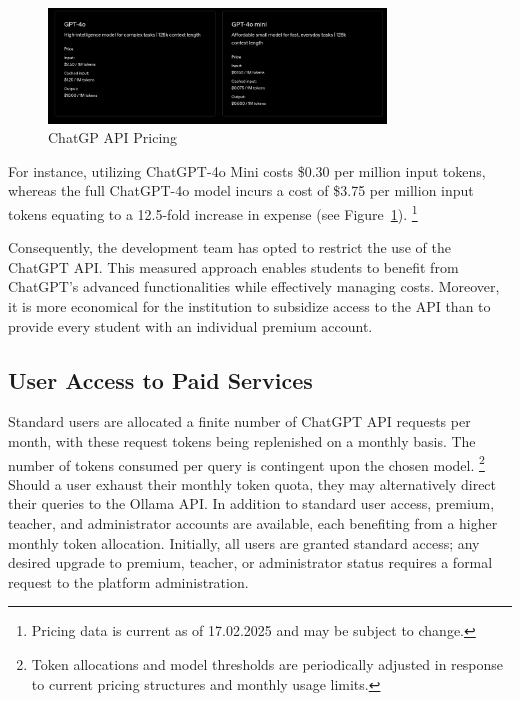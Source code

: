 \begin{figure}[H]
    \centering
    \includegraphics[width=0.8\textwidth]{figures/ChatGPT-API_Pricing.png}
    \caption{ChatGP API Pricing}
    \label{fig:chatgpt_api_integration}
\end{figure}

\cite{ChatGPT-API-Pricing}

For instance, utilizing ChatGPT-4o Mini costs \$0.30 per million input tokens, 
whereas the full ChatGPT-4o model incurs a cost of \$3.75 per million input tokens equating to a 12.5-fold increase in expense 
(see Figure~\ref{fig:chatgpt_api_integration}).
\footnote{Pricing data is current as of 17.02.2025 and may be subject to change.} 

Consequently, the development team has opted to restrict the use of the ChatGPT API. 
This measured approach enables students to benefit from ChatGPT’s advanced functionalities while effectively managing costs. 
Moreover, it is more economical for the institution to subsidize access to the API than to provide every student with an individual premium account.

\subsection{User Access to Paid Services}

Standard users are allocated a finite number of ChatGPT API requests per month, with these request tokens being replenished on a monthly basis. The number of tokens consumed per query is contingent upon the chosen model.
\footnote{Token allocations and model thresholds are periodically adjusted in response to current pricing structures and monthly usage limits.} 
Should a user exhaust their monthly token quota, they may alternatively direct their queries to the Ollama API. In addition to standard user access, premium, teacher, and administrator accounts are available, each benefiting from a higher monthly token allocation. Initially, all users are granted standard access; any desired upgrade to premium, teacher, or administrator status requires a formal request to the platform administration.

